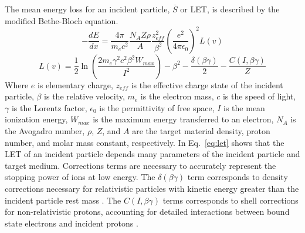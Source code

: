 The mean energy loss for an incident particle, $\overline{S}$ or LET, is described by the modified Bethe-Bloch equation.
\begin{equation}
    \label{eq:let}
    -\frac{dE}{dx} = \frac{4\pi}{m_e c^2} \frac{N_A Z \rho}{A} 
    \frac{z_{eff}^2}{\beta^2}\left(\frac{e^2}{4 \pi \epsilon_0}\right)^2 L(v)
\end{equation}
\begin{equation}
    \label{eq:bethe-bloch-corr-ion}
    L(v) = \frac{1}{2}\ln\left(\frac{2 m_e \gamma^2 c^2 \beta^2 W_{max}}{I^2}\right) - \beta^2 -\frac{\delta(\beta \gamma)}{2} - \frac{C(I,\beta \gamma)}{Z}
\end{equation}
Where $e$ is elementary charge, $z_{eff}$ is the effective charge state of the incident particle, $\beta$ is the relative velocity, $m_e$ is the electron mass, $c$ is the speed of light, $\gamma$ is the Lorentz factor, $\epsilon_0$ is the permittivity of free space, $I$ is the mean ionization energy, $W_{max}$ is the maximum energy transferred to an electron, $N_A$ is the Avogadro number, $\rho$, $Z$, and $A$ are the target material density, proton number, and molar mass constant, respectively.
In Eq.~\ref{eq:let} shows that the LET of an incident particle depends many parameters of the incident particle and target medium. 
Corrections terms are necessary to accurately represent the stopping power of ions at low energy.
The $\delta(\beta \gamma)$ term corresponds to density corrections necessary for relativistic particles with kinetic energy greater than the incident particle rest mass \cite{ziegler2010srim}.
The $C(I,\beta \gamma)$ terms corresponds to shell corrections for non-relativistic protons, accounting for detailed interactions between bound state electrons and incident protons \cite{ziegler2010srim}.

